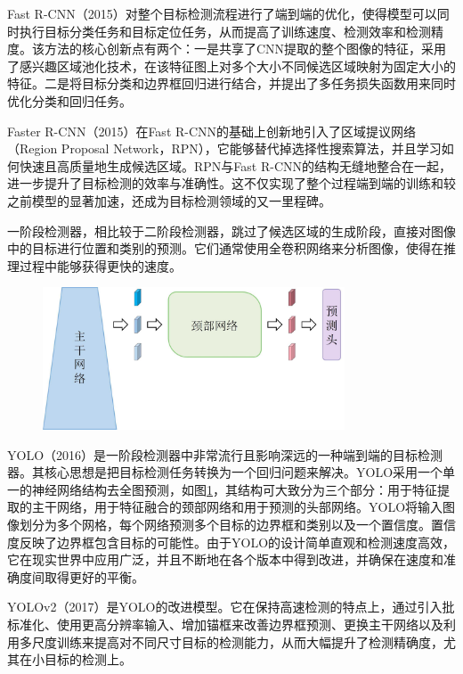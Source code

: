 Fast R-CNN\cite{girshick2015fast}（2015）对整个目标检测流程进行了端到端的优化，使得模型可以同时执行目标分类任务和目标定位任务，从而提高了训练速度、检测效率和检测精度。该方法的核心创新点有两个：一是共享了CNN提取的整个图像的特征，采用了感兴趣区域池化技术，在该特征图上对多个大小不同候选区域映射为固定大小的特征。二是将目标分类和边界框回归进行结合，并提出了多任务损失函数用来同时优化分类和回归任务。

Faster R-CNN\cite{ren2015faster}（2015）在Fast R-CNN的基础上创新地引入了区域提议网络（Region Proposal Network，RPN），它能够替代掉选择性搜索算法，并且学习如何快速且高质量地生成候选区域。RPN与Fast R-CNN的结构无缝地整合在一起，进一步提升了目标检测的效率与准确性。这不仅实现了整个过程端到端的训练和较之前模型的显著加速，还成为目标检测领域的又一里程碑。

一阶段检测器，相比较于二阶段检测器，跳过了候选区域的生成阶段，直接对图像中的目标进行位置和类别的预测。它们通常使用全卷积网络来分析图像，使得在推理过程中能够获得更快的速度。

\begin{figure}[htbp]
  \centering
  \includegraphics[width=0.8\textwidth]{figures/chap02_yolo.jpg}
  \label{fig:chap02_yolo}
\end{figure}

YOLO\cite{redmon2016you}（2016）是一阶段检测器中非常流行且影响深远的一种端到端的目标检测器。其核心思想是把目标检测任务转换为一个回归问题来解决。YOLO采用一个单一的神经网络结构去全图预测，如图\ref{fig:chap02_yolo}，其结构可大致分为三个部分：用于特征提取的主干网络，用于特征融合的颈部网络和用于预测的头部网络。YOLO将输入图像划分为多个网格，每个网络预测多个目标的边界框和类别以及一个置信度。置信度反映了边界框包含目标的可能性。由于YOLO的设计简单直观和检测速度高效，它在现实世界中应用广泛，并且不断地在各个版本中得到改进，并确保在速度和准确度间取得更好的平衡。

YOLOv2\cite{redmon2017yolo9000}（2017）是YOLO\cite{redmon2016you}的改进模型。它在保持高速检测的特点上，通过引入批标准化、使用更高分辨率输入、增加锚框来改善边界框预测、更换主干网络以及利用多尺度训练来提高对不同尺寸目标的检测能力，从而大幅提升了检测精确度，尤其在小目标的检测上。

